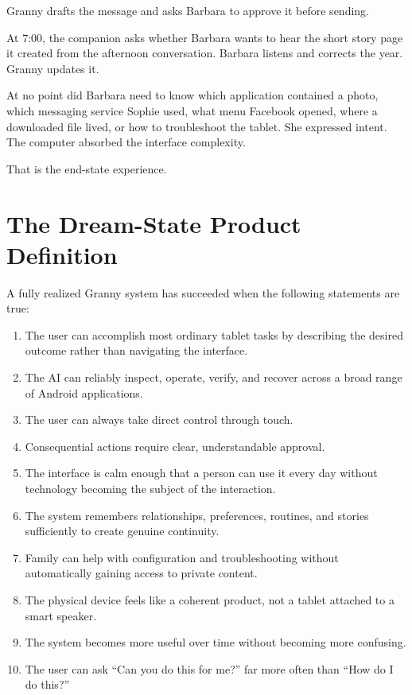\documentclass[11pt]{article}
\begin{document}
Granny drafts the message and asks Barbara to approve it before sending.

At 7:00, the companion asks whether Barbara wants to hear the short story page it created from the afternoon conversation. Barbara listens and corrects the year. Granny updates it.

At no point did Barbara need to know which application contained a photo, which messaging service Sophie used, what menu Facebook opened, where a downloaded file lived, or how to troubleshoot the tablet. She expressed intent. The computer absorbed the interface complexity.

That is the end-state experience.

\section{The Dream-State Product Definition}

A fully realized Granny system has succeeded when the following statements are true:

\begin{enumerate}[leftmargin=*]
    \item The user can accomplish most ordinary tablet tasks by describing the desired outcome rather than navigating the interface.
    \item The AI can reliably inspect, operate, verify, and recover across a broad range of Android applications.
    \item The user can always take direct control through touch.
    \item Consequential actions require clear, understandable approval.
    \item The interface is calm enough that a person can use it every day without technology becoming the subject of the interaction.
    \item The system remembers relationships, preferences, routines, and stories sufficiently to create genuine continuity.
    \item Family can help with configuration and troubleshooting without automatically gaining access to private content.
    \item The physical device feels like a coherent product, not a tablet attached to a smart speaker.
    \item The system becomes more useful over time without becoming more confusing.
    \item The user can ask ``Can you do this for me?'' far more often than ``How do I do this?''
\end{enumerate}
\end{document}
